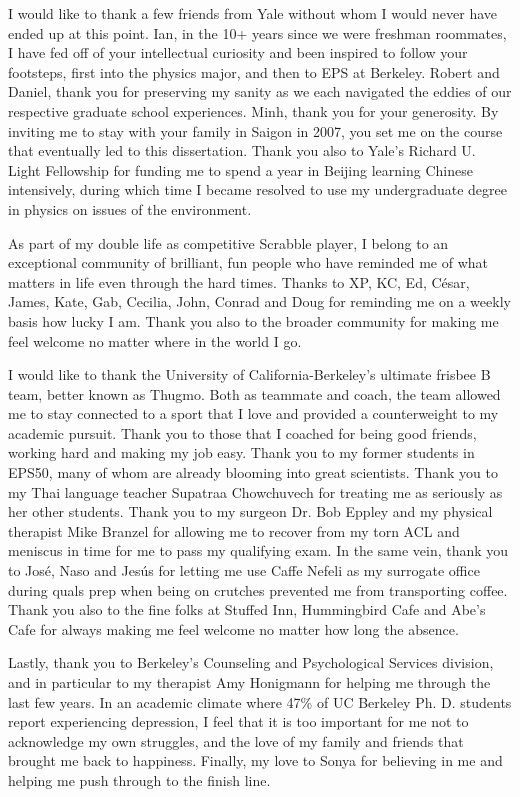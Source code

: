 \documentclass{ucbthesis}
\begin{document}
\begin{frontmatter}
\begin{acknowledgements}
I would like to thank a few friends from Yale without whom I would never have ended up at this point. Ian, in the 10+ years since we were freshman roommates, I have fed off of your intellectual curiosity and been inspired to follow your footsteps, first into the physics major, and then to EPS at Berkeley. Robert and Daniel, thank you for preserving my sanity as we each navigated the eddies of our respective graduate school experiences. Minh, thank you for your generosity. By inviting me to stay with your family in Saigon in 2007, you set me on the course that eventually led to this dissertation. Thank you also to Yale's Richard U. Light Fellowship for funding me to spend a year in Beijing learning Chinese intensively, during which time I became resolved to use my undergraduate degree in physics on issues of the environment.

As part of my double life as competitive Scrabble player, I belong to an exceptional community of brilliant, fun people who have reminded me of what matters in life even through the hard times. Thanks to XP, KC, Ed, C\'{e}sar, James, Kate, Gab, Cecilia, John, Conrad and Doug for reminding me on a weekly basis how lucky I am. Thank you also to the broader community for making me feel welcome no matter where in the world I go.

I would like to thank the University of California-Berkeley's ultimate frisbee B team, better known as Thugmo. Both as teammate and coach, the team allowed me to stay connected to a sport that I love and provided a counterweight to my academic pursuit. Thank you to those that I coached for being good friends, working hard and making my job easy. Thank you to my former students in EPS50, many of whom are already blooming into great scientists. Thank you to my Thai language teacher Supatraa Chowchuvech for treating me as seriously as her other students. Thank you to my surgeon Dr. Bob Eppley and my physical therapist Mike Branzel for allowing me to recover from my torn ACL and meniscus in time for me to pass my qualifying exam. In the same vein, thank you to Jos\'{e}, Naso and Jes\'{u}s for letting me use Caffe Nefeli as my surrogate office during quals prep when being on crutches prevented me from transporting coffee. Thank you also to the fine folks at Stuffed Inn, Hummingbird Cafe and Abe's Cafe for always making me feel welcome no matter how long the absence.

Lastly, thank you to Berkeley's Counseling and Psychological Services division, and in particular to my therapist Amy Honigmann for helping me through the last few years. In an academic climate where 47\% of UC Berkeley Ph. D. students report experiencing depression, I feel that it is too important for me not to acknowledge my own struggles, and the love of my family and friends that brought me back to happiness. Finally, my love to Sonya for believing in me and helping me push through to the finish line.

\end{acknowledgements}

\end{frontmatter}
\end{document}
